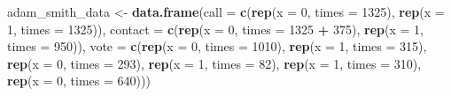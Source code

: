 \documentclass[12pt,leqno]{article}
\newenvironment{Shaded}{\begin{snugshade}}{\end{snugshade}}
\newcommand{\DataTypeTok}[1]{\textcolor[rgb]{0.13,0.29,0.53}{#1}}
\newcommand{\DecValTok}[1]{\textcolor[rgb]{0.00,0.00,0.81}{#1}}
\newcommand{\KeywordTok}[1]{\textcolor[rgb]{0.13,0.29,0.53}{\textbf{#1}}}
\newcommand{\NormalTok}[1]{#1}
\newcommand{\OperatorTok}[1]{\textcolor[rgb]{0.81,0.36,0.00}{\textbf{#1}}}
\newcommand{\StringTok}[1]{\textcolor[rgb]{0.31,0.60,0.02}{#1}}
\theoremstyle{newstyle}
\begin{document}
\begin{Shaded}
\begin{Highlighting}[]
\NormalTok{adam\_smith\_data \textless{}{-}}\StringTok{ }\KeywordTok{data.frame}\NormalTok{(}\DataTypeTok{call =} \KeywordTok{c}\NormalTok{(}\KeywordTok{rep}\NormalTok{(}\DataTypeTok{x =} \DecValTok{0}\NormalTok{, }\DataTypeTok{times =} \DecValTok{1325}\NormalTok{), }\KeywordTok{rep}\NormalTok{(}\DataTypeTok{x =} \DecValTok{1}\NormalTok{, }\DataTypeTok{times =} \DecValTok{1325}\NormalTok{)),}
                              \DataTypeTok{contact =} \KeywordTok{c}\NormalTok{(}\KeywordTok{rep}\NormalTok{(}\DataTypeTok{x =} \DecValTok{0}\NormalTok{, }\DataTypeTok{times =} \DecValTok{1325} \OperatorTok{+}\StringTok{ }\DecValTok{375}\NormalTok{), }\KeywordTok{rep}\NormalTok{(}\DataTypeTok{x =} \DecValTok{1}\NormalTok{, }\DataTypeTok{times =} \DecValTok{950}\NormalTok{)),}
                              \DataTypeTok{vote =} \KeywordTok{c}\NormalTok{(}\KeywordTok{rep}\NormalTok{(}\DataTypeTok{x =} \DecValTok{0}\NormalTok{, }\DataTypeTok{times =} \DecValTok{1010}\NormalTok{), }\KeywordTok{rep}\NormalTok{(}\DataTypeTok{x =} \DecValTok{1}\NormalTok{, }\DataTypeTok{times =} \DecValTok{315}\NormalTok{),}
                                       \KeywordTok{rep}\NormalTok{(}\DataTypeTok{x =} \DecValTok{0}\NormalTok{, }\DataTypeTok{times =} \DecValTok{293}\NormalTok{), }\KeywordTok{rep}\NormalTok{(}\DataTypeTok{x =} \DecValTok{1}\NormalTok{, }\DataTypeTok{times =} \DecValTok{82}\NormalTok{),}
                                       \KeywordTok{rep}\NormalTok{(}\DataTypeTok{x =} \DecValTok{1}\NormalTok{, }\DataTypeTok{times =} \DecValTok{310}\NormalTok{), }\KeywordTok{rep}\NormalTok{(}\DataTypeTok{x =} \DecValTok{0}\NormalTok{, }\DataTypeTok{times =} \DecValTok{640}\NormalTok{)))}
\end{Highlighting}
\end{Shaded}


\newpage
\singlespacing 

\end{document}
